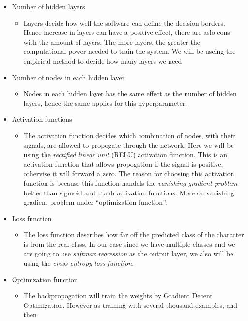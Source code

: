 \documentclass[11pt,a4paper,english]{article}
\begin{document}
\begin{itemize}
 \item{Number of hidden layers}
 \begin{itemize}
  \item{Layers decide how well the software can define the decision borders.
  Hence increase in layers can have a positive effect, there are aslo cons with
  the amount of layers. The more layers, the greater the computational power
  needed to train the system. We will be useing the empirical method to decide
  how many layers we need}
 \end{itemize}
 \item{Number of nodes in each hidden layer}
 \begin{itemize}
  \item{Nodes in each hidden layer has the same effect as the number of hidden
  layers, hence the same applies for this hyperparameter. }
 \end{itemize}
 \item{Activation functions}
 \begin{itemize}
  \item{The activation function decides which combination of nodes, with their
  signals, are allowed to propogate through the network. Here we will be using
  the \textit{rectified linear unit} (RELU) activation function. This is an
  activation function that allows propogation if the signal is positive,
  othervise it will forward a zero. The reason for choosing this activation
  function is because this function handels the \textit{vanishing gradient
  problem} better than sigmoid and atanh activation functions. More on
  vanishing gradient problem under ``optimization function''.}
 \end{itemize}
 \item{Loss function}
 \begin{itemize}
  \item{The loss function describes how far off the predicted class of the
  character is from the real class. In our case since we have multiple
  classes and we are going to use \textit{softmax regression} as the output
  layer, we also will be using the \textit{cross-entropy loss function}.}
 \end{itemize}
 \item{Optimization function}
 \begin{itemize}
  \item{The backpropogation will train the weights by Gradient Decent
  Optimization. However as training with several thousand examples, and then
}
\end{itemize}
\end{itemize}
\end{document}
